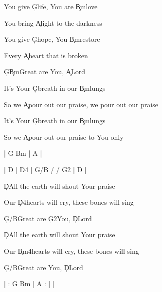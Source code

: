 \documentclass[9pt]{extarticle}
\begin{document}
\bsong

\bv
You give \c{G}life, You are \c{Bm}love

You bring \c{A}light to the darkness

You give \c{G}hope, You \c{Bm}restore

Every \c{A}heart that is broken

\c{G}\c{Bm}Great are You, \c{A}Lord
\ev

\bc
It's Your \c{G}breath in our \c{Bm}lungs

So we \c{A}pour out our praise, we pour out our praise

It's Your \c{G}breath in our \c{Bm}lungs

So we \c{A}pour out our praise to You only
\ec

\bin
| G Bm | A |
\ein



\bin
| D | D4 |  G/B / / G2  | D |
\ein

\bb[2]
\c{D}All the earth will shout Your praise

Our \c{D4}hearts will cry, these bones will sing

\c{G/B}Great are \c{G2}You, \c{D}Lord
\eb

\bb
\c{D}All the earth will shout Your praise

Our \c{Bm4}hearts will cry, these bones will sing

\c{G/B}Great are You, \c{D}Lord
\eb


\bo
| : G Bm | A : |  |
\eo

\esong
\end{document}
